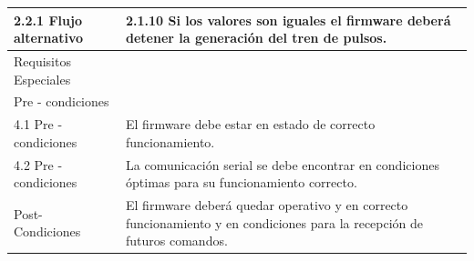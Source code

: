 \begin{table}[H]
\begin{center}
\begin{tabular}{ | m{4cm} | m{9cm} | }
2.2.1 Flujo alternativo & 
2.1.10 Si los valores son iguales el firmware deberá detener la generación del tren de pulsos. \\ \hline
Requisitos Especiales & \\ \hline


Pre - condiciones & \\ \hline
 
4.1 Pre - condiciones &
El firmware debe estar en estado de correcto funcionamiento. \\ \hline
4.2 Pre - condiciones &
La comunicación serial se debe encontrar en condiciones óptimas para su funcionamiento correcto. \\ \hline
Post- Condiciones &
El firmware deberá quedar operativo y en correcto funcionamiento y en condiciones para la recepción de futuros comandos.\\ \hline
\end{tabular}

\label{tab:establecer un determinado valor de caudal.}
\end{center}
\end{table}



